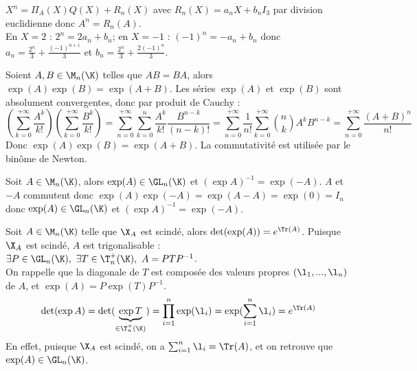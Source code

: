 \documentclass[11pt]{article}
\begin{document}
\begin{exercice}{}{}
     $X^n = \Pi_A(X)Q(X)+R_n(X)$ avec $R_n(X)=a_n X + b_n I_3$ par division euclidienne donc $A^n=R_n(A)$.\\
    En $X=2$ : $2^n = 2 a_n + b_n$; en $X=-1$ : $(-1)^n = -a_n+b_n$ donc $a_n = \frac{2^n}{3}+\frac{(-1)^{n+1}}{3}$ et $b_n = \frac{2^n}{3}+\frac{2(-1)^n}{3}$.
\end{exercice}

\begin{prop}{}{}
    Soient $A,B\in\M_n(\K)$ telles que $AB=BA$, alors $\exp(A)\exp(B)=\exp(A+B)$.
    \tcblower
    Les séries $\exp(A)$ et $\exp(B)$ sont absolument convergentes, donc par produit de Cauchy :
    \begin{equation*}
        \left( \sum_{k=0}^{+\infty}\frac{A^k}{k!} \right)\left( \sum_{k=0}^{+\infty}\frac{B^k}{k!} \right) = \sum_{n=0}^{+\infty}\sum_{k=0}^n \frac{A^k}{k!}\frac{B^{n-k}}{(n-k)!} = \sum_{n=0}^{+\infty} \frac{1}{n!}\sum_{k=0}^{+\infty}\binom{n}{k}A^kB^{n-k} = \sum_{n=0}^{+\infty}\frac{(A+B)^n}{n!}
    \end{equation*}
    Donc $\exp(A)\exp(B)=\exp(A+B)$. La commutativité est utilisée par le binôme de Newton.
\end{prop}

\vspace*{-0.9cm}

\begin{prop}{}{}
    Soit $A\in\M_n(\K)$, alors $\exp(A)\in\GL_n(\K)$ et $(\exp A)^{-1} = \exp(-A)$.
    \tcblower
    \small $A$ et $-A$ commutent donc $\exp(A)\exp(-A)=\exp(A-A)=\exp(0)=I_n$ donc $\exp(A)\in\GL_n(\K)$ et $(\exp A)^{-1}=\exp(-A)$.
\end{prop}

\vspace*{-0.9cm}

\begin{prop}{}{}
    Soit $A\in\M_n(\K)$ telle que $\X_A$ est scindé, alors $\det(\exp(A))=e^{\Tr(A)}$.
    \tcblower
    Puisque $\X_A$ est scindé, $A$ est trigonalisable : $\exists P \in \GL_n(\K), ~ \exists T \in \T_n^+(\K), ~ A=PTP^{-1}$.\\
    On rappelle que la diagonale de $T$ est composée des valeurs propres $(\l_1,...,\l_n)$ de $A$, et $\exp(A)=P\exp(T)P^{-1}$.
    \begin{equation*}
        \det(\exp A) = \det(\underbrace{\exp T}_{\in\T_n^+(\K)}) = \prod_{i=1}^n \exp(\l_i) = \exp(\sum_{i=1}^n \l_i) = e^{\Tr(A)}
    \end{equation*}
    En effet, puisque $\X_A$ est scindé, on a $\sum_{i=1}^n \l_i = \Tr(A)$, et on retrouve que $\exp(A)\in\GL_n(\K)$.
\end{prop}
\end{document}
